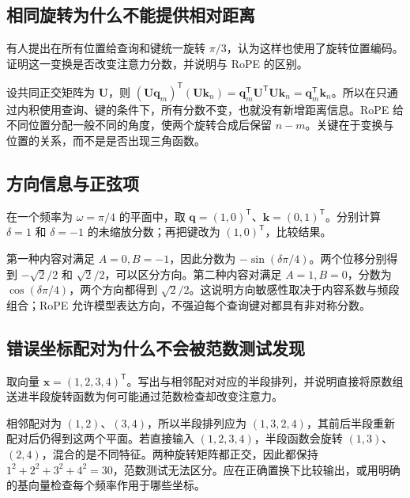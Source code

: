 \documentclass[UTF8,12pt,a4paper,fontset=fandol]{ctexart}
\begin{document}
\subsection{相同旋转为什么不能提供相对距离}
\begin{example}[固定角度与位置角度]
有人提出在所有位置给查询和键统一旋转 $\pi/3$，认为这样也使用了旋转位置编码。证明这一变换是否改变注意力分数，并说明与 RoPE 的区别。
\end{example}
\begin{solve}
设共同正交矩阵为 $\mathbf U$，则 $(\mathbf U\mathbf q_m)^{\mathsf T}(\mathbf U\mathbf k_n)=\mathbf q_m^{\mathsf T}\mathbf U^{\mathsf T}\mathbf U\mathbf k_n=\mathbf q_m^{\mathsf T}\mathbf k_n$。所以在只通过内积使用查询、键的条件下，所有分数不变，也就没有新增距离信息。RoPE 给不同位置分配一般不同的角度，使两个旋转合成后保留 $n-m$。关键在于变换与位置的关系，而不是是否出现三角函数。
\end{solve}

\subsection{方向信息与正弦项}
\begin{example}[前后位置可否区分]
在一个频率为 $\omega=\pi/4$ 的平面中，取 $\mathbf q=(1,0)^{\mathsf T}$、$\mathbf k=(0,1)^{\mathsf T}$。分别计算 $\delta=1$ 和 $\delta=-1$ 的未缩放分数；再把键改为 $(1,0)^{\mathsf T}$，比较结果。
\end{example}
\begin{solve}
第一种内容对满足 $A=0,B=-1$，因此分数为 $-\sin(\delta\pi/4)$。两个位移分别得到 $-\sqrt2/2$ 和 $\sqrt2/2$，可以区分方向。第二种内容对满足 $A=1,B=0$，分数为 $\cos(\delta\pi/4)$，两个方向都得到 $\sqrt2/2$。这说明方向敏感性取决于内容系数与频段组合；RoPE 允许模型表达方向，不强迫每个查询键对都具有非对称分数。
\end{solve}

\subsection{错误坐标配对为什么不会被范数测试发现}
\begin{example}[四维置换]
取向量 $\mathbf x=(1,2,3,4)^{\mathsf T}$。写出与相邻配对对应的半段排列，并说明直接将原数组送进半段旋转函数为何可能通过范数检查却改变注意力。
\end{example}
\begin{solve}
相邻配对为 $(1,2)$、$(3,4)$，所以半段排列应为 $(1,3,2,4)$，其前后半段重新配对后仍得到这两个平面。若直接输入 $(1,2,3,4)$，半段函数会旋转 $(1,3)$、$(2,4)$，混合的是不同特征。两种旋转矩阵都正交，因此都保持 $1^2+2^2+3^2+4^2=30$，范数测试无法区分。应在正确置换下比较输出，或用明确的基向量检查每个频率作用于哪些坐标。
\end{solve}
\end{document}

